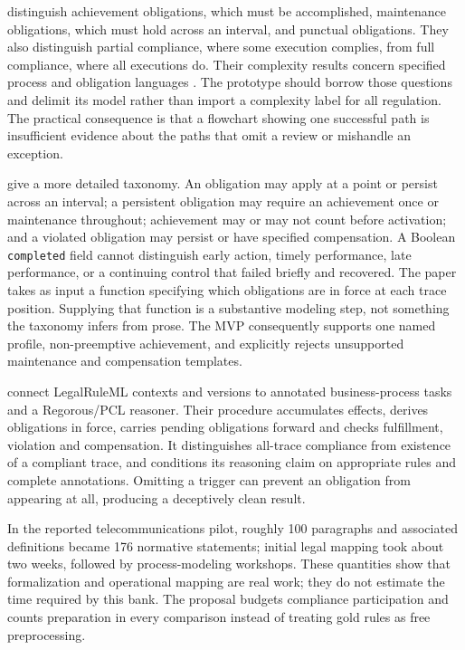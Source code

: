 \documentclass[12pt,a4paper,oneside,openany]{book}
\begin{document}
\citet[sec.~2]{compliancehard2015} distinguish achievement obligations, which must
be accomplished, maintenance obligations, which must hold across an interval,
and punctual obligations. They also distinguish partial compliance, where some
execution complies, from full compliance, where all executions do. Their
complexity results concern specified process and obligation languages
\citep[secs.~3--4]{compliancehard2015}. The prototype should borrow those questions
and delimit its model rather than import a complexity label for all regulation.
The practical consequence is that a flowchart showing one successful path is
insufficient evidence about the paths that omit a review or mishandle an exception.

\citet[sec.~3, Definitions 10--17]{normative2016} give a more detailed taxonomy.
An obligation may apply at a point or persist across an interval; a persistent
obligation may require an achievement once or maintenance throughout; achievement
may or may not count before activation; and a violated obligation may persist or
have specified compensation. A Boolean \texttt{completed} field cannot distinguish
early action, timely performance, late performance, or a continuing control that
failed briefly and recovered. The paper takes as input a function specifying
which obligations are in force at each trace position. Supplying that function
is a substantive modeling step, not something the taxonomy infers from prose.
The MVP consequently supports one named profile, non-preemptive achievement,
and explicitly rejects unsupported maintenance and compensation templates.

\citet[secs.~3--4]{semanticcompliance2016} connect LegalRuleML contexts and
versions to annotated business-process tasks and a Regorous/PCL reasoner. Their
procedure accumulates effects, derives obligations in force, carries pending
obligations forward and checks fulfillment, violation and compensation. It
distinguishes all-trace compliance from existence of a compliant trace, and
conditions its reasoning claim on appropriate rules and complete annotations.
Omitting a trigger can prevent an obligation from appearing at all, producing a
deceptively clean result.

In the reported telecommunications pilot, roughly 100 paragraphs and associated
definitions became 176 normative statements; initial legal mapping took about
two weeks, followed by process-modeling workshops. These quantities show that
formalization and operational mapping are real work; they do not estimate the
time required by this bank. The proposal budgets compliance participation and
counts preparation in every comparison instead of treating gold rules as free
preprocessing.
\end{document}
